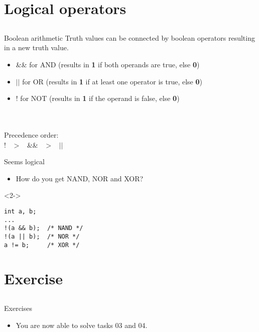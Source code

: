 \section{Logical operators}
\subsection{}
\begin{frame}{Boolean arithmetic}
	Truth values can be connected by boolean operators resulting in a new truth value.
	\begin{itemize}
		\item \&\& for AND (results in \textbf{1} if both operands are true, else \textbf{0})
		\item $||$ for OR (results in \textbf{1} if at least one operator is true, else \textbf{0})
		\item ! for NOT (results in \textbf{1} if the operand is false, else \textbf{0})
	\end{itemize}
	\ \\\ \\Precedence order:\\
	\centering
	! \ $>$ \ \&\& \ $>$ \ $||$ 
\end{frame}
\begin{frame}[fragile]{Seems logical}
	\begin{itemize}
		\item How do you get NAND, NOR and XOR?
	\end{itemize}
	\begin{uncoverenv}<2->
		\begin{lstlisting}[numbers=none]
int a, b;
...
!(a && b);	/* NAND */
!(a || b);	/* NOR */
a != b;		/* XOR */
\end{lstlisting}
	\end{uncoverenv}
\end{frame}
\section{Exercise}
\subsection{}
\begin{frame}{Exercises}
	\begin{itemize}
		\item You are now able to solve tasks 03 and 04.
	\end{itemize}
\end{frame}

